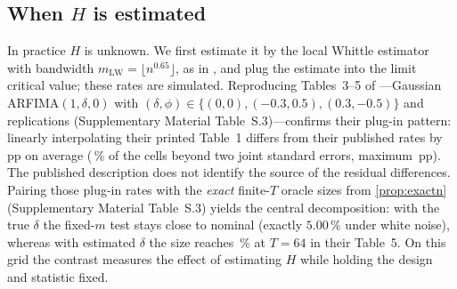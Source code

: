 \subsection{When \texorpdfstring{$H$}{H} is estimated}\label{sec:plugin}
In practice $H$ is unknown. We first estimate it by the local Whittle estimator \citep{Rob95} with bandwidth
$m_{\mathrm{LW}}=\lfloor n^{0.65}\rfloor$, as in \citet{HI17}, and plug the estimate into the limit critical value;
these rates are simulated. Reproducing Tables~3--5 of \citet{HI17}---Gaussian ARFIMA$(1,\delta,0)$ with
$(\delta,\phi)\in\{(0,0),(-0.3,0.5),(0.3,-0.5)\}$ and  replications (Supplementary Material Table~S.3)---confirms
their plug-in pattern: linearly interpolating their printed Table~1 differs from their published rates by
\,pp on average (\,\% of the  cells beyond two joint
standard errors, maximum \,pp). The published description does not identify the source of the residual differences. Pairing those
plug-in rates with the \emph{exact} finite-$T$ oracle sizes from \cref{prop:exactn} (Supplementary Material Table~S.3)
yields the central decomposition: with the true $\delta$ the fixed-$m$ test stays close to nominal (exactly $5.00\,\%$
under white noise), whereas with estimated $\delta$ the size reaches \,\% at $T=64$ in
their Table~5. On this grid the contrast measures the effect of estimating $H$ while holding the design and statistic fixed.


